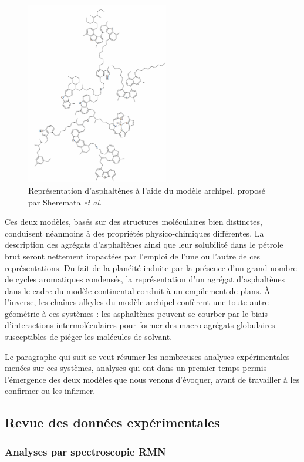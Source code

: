 \documentclass[12pt,a4paper]{book}
\begin{document}
\begin{figure}[h!]
	\centering
	\includegraphics[height=8cm]{../image/Sher}
	\caption[Molecule d'asphaltènes type archipel]{Représentation d'asphaltènes à l'aide du modèle archipel, proposé par Sheremata \textit{et al.}\cite{sheremata2004quantitative}}
	\label{fig2}
\end{figure}

Ces deux modèles, basés sur des structures moléculaires bien distinctes, conduisent néanmoins à des propriétés physico-chimiques différentes. La description des agrégats d'asphaltènes ainsi que leur solubilité dans le pétrole brut seront nettement impactées par l'emploi de l'une ou l'autre de ces représentations. Du fait de la planéité induite par la présence d'un grand nombre de cycles aromatiques condensés, la représentation d'un agrégat d'asphaltènes dans le cadre du modèle continental conduit à un empilement de plans. À l'inverse, les chaînes alkyles du modèle archipel confèrent une toute autre géométrie à ces systèmes : les asphaltènes peuvent se courber par le biais d'interactions intermoléculaires pour former des macro-agrégats globulaires susceptibles de piéger les molécules de solvant. \bigskip

Le paragraphe qui suit se veut résumer les nombreuses analyses expérimentales menées sur ces systèmes, analyses qui ont dans un premier temps permis l'émergence des deux modèles que nous venons d'évoquer, avant de travailler à les confirmer ou les infirmer. 

\subsection{Revue des données expérimentales}

\subsubsection{Analyses par spectroscopie RMN}
\end{document}
